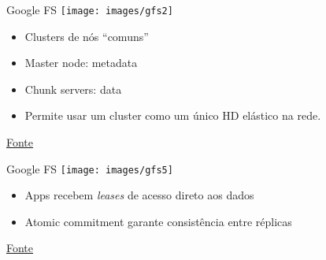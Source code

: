 \begin{frame}{Google FS}
\texttt{[image: images/gfs2]}

\begin{itemize}
\item Clusters de nós ``comuns''
\item Master node: metadata
\item Chunk servers: data
\item Permite usar um cluster como um único HD elástico na rede.
\end{itemize}

\href{https://www.cs.rutgers.edu/~pxk/417/lectures/l-dfs.html}{Fonte}
\end{frame}

\begin{frame}{Google FS}
\texttt{[image: images/gfs5]}

\begin{itemize}
	\item Apps recebem \emph{leases} de acesso direto aos dados
	\item Atomic commitment garante consistência entre réplicas
\end{itemize}

\href{http://google-file-system.wikispaces.asu.edu/}{Fonte}
\end{frame}

